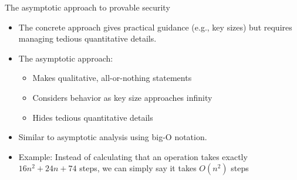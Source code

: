 \documentclass[aspectratio=169, lualatex, handout]{beamer}
\begin{document}
\begin{frame}{The asymptotic approach to provable security}
	\begin{itemize}[<+->]
		\item The concrete approach gives practical guidance (e.g., key sizes) but requires managing tedious quantitative details.
		\item The asymptotic approach:
		      \begin{itemize}
			      \item Makes qualitative, all-or-nothing statements
			      \item Considers behavior as key size approaches infinity
			      \item Hides tedious quantitative details
		      \end{itemize}
		\item Similar to asymptotic analysis using big-O notation.
		\item Example: Instead of calculating that an operation takes exactly $16n^2 + 24n + 74$ steps, we can simply say it takes $O(n^2)$ steps
	\end{itemize}
\end{frame}
\end{document}
